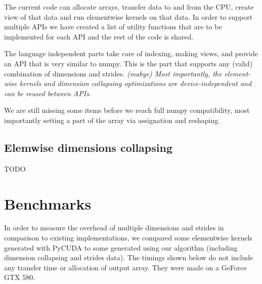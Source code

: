 \documentclass{article} %
\begin{document}
The current code can allocate arrays, transfer data to and from the CPU, create view of that data and run elementwise kernels on that data.  In order to support multiple APIs we have created a list of utility functions that are to be implemented for each API and the rest of the code is shared.

The language independent parts take care of indexing, making views, and provide an API that is very similar to numpy.  This is the part that supports any (valid) combination of dimensions and strides.  \emph{(mabye) Most importantly, the element-wise kernels and dimension collapsing optimizations are device-independent and can be reused between APIs.}

We are still missing some items before we reach full numpy compatibility, most importantly setting a part of the array via assignation and reshaping.

\subsection{Elemwise dimensions collapsing}
TODO

\section{Benchmarks}

In order to measure the overhead of multiple dimensions and strides in comparison to existing implementations, we compared some elementwise kernels generated with PyCUDA to some generated using our algorithm (including dimension collapsing and strides data).
The timings shown below do not include any transfer time or allocation of output array.
They were made on a GeForce GTX 580.
\end{document}
